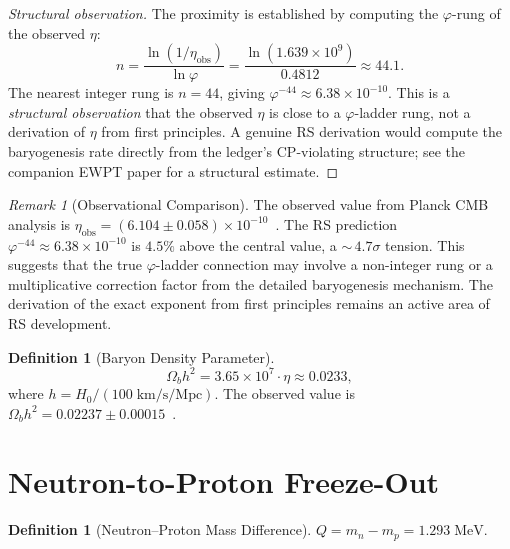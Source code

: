 \documentclass[12pt,a4paper]{article}
\theoremstyle{definition}
\newtheorem{definition}[theorem]{Definition}
\theoremstyle{remark}
\newtheorem{remark}[theorem]{Remark}
\begin{document}
\begin{proof}[Structural observation]
The proximity is established by computing the $\varphi$-rung
of the observed $\eta$:
\begin{equation}
  n = \frac{\ln(1/\eta_{\mathrm{obs}})}{\ln\varphi}
  = \frac{\ln(1.639 \times 10^{9})}{0.4812}
  \approx 44.1.
\end{equation}
The nearest integer rung is $n = 44$, giving
$\varphi^{-44} \approx 6.38 \times 10^{-10}$.  This is a
\emph{structural observation} that the observed $\eta$ is close
to a $\varphi$-ladder rung, not a derivation of $\eta$ from first
principles.  A genuine RS derivation would compute the
baryogenesis rate directly from the ledger's CP-violating
structure; see the companion EWPT paper for a structural estimate.
\end{proof}

\begin{remark}[Observational Comparison]
The observed value from Planck CMB analysis is
$\eta_{\mathrm{obs}} = (6.104 \pm 0.058) \times
10^{-10}$~\cite{Planck2020}.  The RS prediction
$\varphi^{-44} \approx 6.38 \times 10^{-10}$ is $4.5\%$ above
the central value, a ${\sim}\,4.7\sigma$ tension.  This suggests
that the true $\varphi$-ladder connection may involve a
non-integer rung or a multiplicative correction factor from the
detailed baryogenesis mechanism.  The derivation of the exact
exponent from first principles remains an active area of RS
development.
\end{remark}

\begin{definition}[Baryon Density Parameter]
\begin{equation}
  \Omega_b h^2 = 3.65 \times 10^7 \cdot \eta \approx 0.0233,
\end{equation}
where $h = H_0/(100\;\mathrm{km/s/Mpc})$.  The observed value is
$\Omega_b h^2 = 0.02237 \pm 0.00015$~\cite{Planck2020}.
\end{definition}

\section{Neutron-to-Proton Freeze-Out}
\label{sec:np}

\begin{definition}[Neutron--Proton Mass Difference]
$Q = m_n - m_p = 1.293\;\mathrm{MeV}$.
\end{definition}
\end{document}
